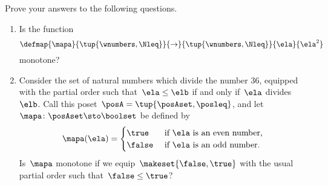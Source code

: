 \clearpage
\vfill
\begin{gradedexercise}
    \label{ex:MonotoneMapCheck?}

    Prove your answers to the following questions.
    \begin{enumerate}
        \item Is the function
              \begin{equation}\label{eq:MonotoneMapCheck-1}
                  \defmap{\mapa}{\tup{\wnumbers,\Nleq}}{\to}{\tup{\wnumbers, \Nleq}}{\ela}{\ela^2}
              \end{equation}
              monotone?
        \item Consider the set of natural numbers which divide the number 36, equip\-ped with the partial order such that~$\ela \leq \elb$ if and only if~$\ela$ divides~$\elb$.
              Call this poset~$\posA = \tup{\posAset, \posleq}$, and let~$\mapa \colon \posAset \sto \boolset$ be defined by
              \begin{equation}\label{eq:MonotoneMapCheck-2}
                  \mapa(\ela) =
                  \begin{cases}
                      \true  & \text{ if } \ela \text{ is an even number, } \\
                      \false & \text{ if } \ela \text{ is an odd number.
                      }
                  \end{cases}
              \end{equation}
              Is~$\mapa$ monotone if we equip~$\makeset{\false, \true}$ with the usual partial order such that~$\false \leq \true$?
    \end{enumerate}
\end{gradedexercise}

